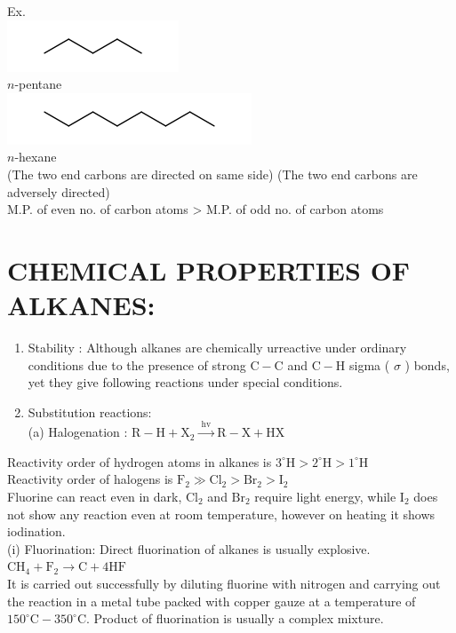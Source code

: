 \documentclass[10pt]{article}
\begin{document}
Ex.\\
\includegraphics{smile-8bf68b71d0722832c2b2a102804f9021ea22a757}\\
$n$-pentane\\
\includegraphics{smile-b7d0c4153efb4fc2ba630b948bd680f7d4b3cf48}\\
$n$-hexane\\
(The two end carbons are directed on same side) (The two end carbons are adversely directed)\\
M.P. of even no. of carbon atoms > M.P. of odd no. of carbon atoms

\section*{CHEMICAL PROPERTIES OF ALKANES:}
\begin{enumerate}
  \item Stability : Although alkanes are chemically urreactive under ordinary conditions due to the presence of strong $\mathrm{C}-\mathrm{C}$ and $\mathrm{C}-\mathrm{H}$ sigma ( $\sigma$ ) bonds, yet they give following reactions under special conditions.
  \item Substitution reactions:\\
(a) Halogenation : $\mathrm{R}-\mathrm{H}+\mathrm{X}_{2} \xrightarrow{\text { hv }} \mathrm{R}-\mathrm{X}+\mathrm{HX}$
\end{enumerate}

Reactivity order of hydrogen atoms in alkanes is $3^{\circ} \mathrm{H}>2^{\circ} \mathrm{H}>1^{\circ} \mathrm{H}$\\
Reactivity order of halogens is $\mathrm{F}_{2} \gg \mathrm{Cl}_{2}>\mathrm{Br}_{2}>\mathrm{I}_{2}$\\
Fluorine can react even in dark, $\mathrm{Cl}_{2}$ and $\mathrm{Br}_{2}$ require light energy, while $\mathrm{I}_{2}$ does not show any reaction even at room temperature, however on heating it shows iodination.\\
(i) Fluorination: Direct fluorination of alkanes is usually explosive.\\
$\mathrm{CH}_{4}+\mathrm{F}_{2} \longrightarrow \mathrm{C}+4 \mathrm{HF}$\\
It is carried out successfully by diluting fluorine with nitrogen and carrying out the reaction in a metal tube packed with copper gauze at a temperature of $150^{\circ} \mathrm{C}-350^{\circ} \mathrm{C}$. Product of fluorination is usually a complex mixture.
\end{document}
